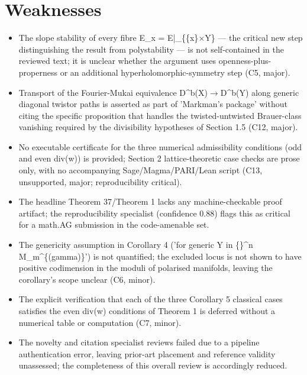 \documentclass[11pt]{article}
\begin{document}
\section*{Weaknesses}
\begin{itemize}[leftmargin=*]
  \item The slope stability of every fibre E\_x = E|\_\{\{x\}\ensuremath{\times}Y\} --- the critical new step distinguishing the result from polystability --- is not self-contained in the reviewed text; it is unclear whether the argument uses openness-plus-properness or an additional hyperholomorphic-symmetry step (C5, major).
  \item Transport of the Fourier-Mukai equivalence D\^{}b(X)\ensuremath{\to}D\^{}b(Y) along generic diagonal twistor paths is asserted as part of 'Markman's package' without citing the specific proposition that handles the twisted-untwisted Brauer-class vanishing required by the divisibility hypotheses of Section 1.5 (C12, major).
  \item No executable certificate for the three numerical admissibility conditions (odd and even div(w)) is provided; Section 2 lattice-theoretic case checks are prose only, with no accompanying Sage/Magma/PARI/Lean script (C13, unsupported, major; reproducibility critical).
  \item The headline Theorem 37/Theorem 1 lacks any machine-checkable proof artifact; the reproducibility specialist (confidence 0.88) flags this as critical for a math.AG submission in the code-amenable set.
  \item The genericity assumption in Corollary 4 ('for generic Y in \{\}\^{}n M\_m\^{}\{(gamma)\}') is not quantified; the excluded locus is not shown to have positive codimension in the moduli of polarised manifolds, leaving the corollary's scope unclear (C6, minor).
  \item The explicit verification that each of the three Corollary 5 classical cases satisfies the even div(w) conditions of Theorem 1 is deferred without a numerical table or computation (C7, minor).
  \item The novelty and citation specialist reviews failed due to a pipeline authentication error, leaving prior-art placement and reference validity unassessed; the completeness of this overall review is accordingly reduced.
\end{itemize}
\end{document}
